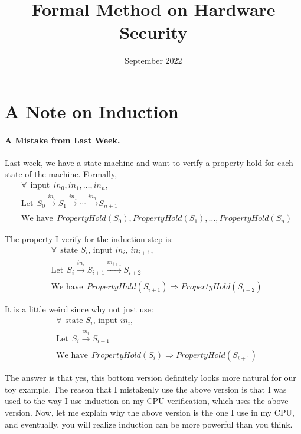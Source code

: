 \documentclass{article}
\title{Formal Method on Hardware Security}
\author{}
\date{September 2022}
\begin{document}
\maketitle










\section{A Note on Induction}


\paragraph{A Mistake from Last Week.}
Last week, we have a state machine and want to verify a property hold for each state of the machine.
Formally,
\begin{align*}
& \forall ~~ \text{input} ~~ in_0, in_1, \dots, in_n, \\
& \text{Let} ~~ S_0 \xrightarrow[]{in_0} S_{1} \xrightarrow[]{in_1} \cdots \xrightarrow[]{in_n} S_{n+1} \\
& \text{We have} ~~ PropertyHold(S_0), PropertyHold(S_1), \dots, PropertyHold(S_n)
\end{align*}

The property I verify for the induction step is:
\begin{align*}
& \forall ~~ \text{state $S_i$, input $in_i$, $in_{i+1}$}, \\
& \text{Let} ~~ S_i \xrightarrow[]{in_i} S_{i+1} \xrightarrow[]{in_{i+1}} S_{i+2} \\
& \text{We have} ~~ PropertyHold(S_{i+1}) \Rightarrow PropertyHold(S_{i+2})
\end{align*}

It is a little weird since why not just use:
\begin{align*}
& \forall ~~ \text{state $S_i$, input $in_i$}, \\
& \text{Let} ~~ S_i \xrightarrow[]{in_i} S_{i+1} \\
& \text{We have} ~~ PropertyHold(S_{i}) \Rightarrow PropertyHold(S_{i+1})
\end{align*}

The answer is that yes, this bottom version definitely looks more natural for our toy example.
The reason that I mistakenly use the above version is that I was used to the way I use induction on my CPU verification, which uses the above version.
Now, let me explain why the above version is the one I use in my CPU, and eventually, you will realize induction can be more powerful than you think.
\end{document}
